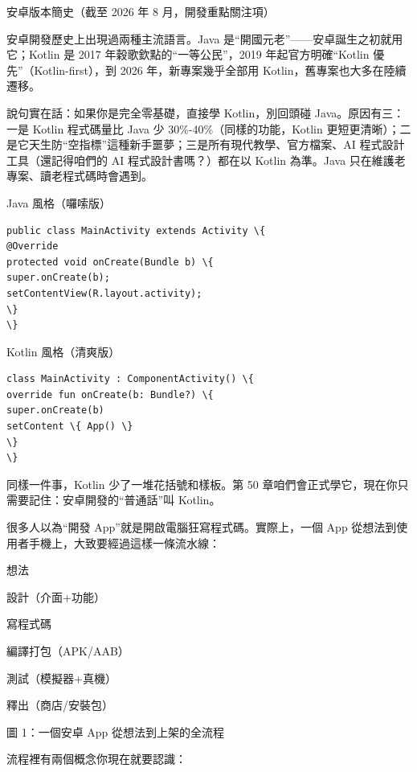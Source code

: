 \begin{center}\small\color{gray}安卓版本簡史（截至 2026 年 8 月，開發重點關注項）\end{center}


安卓開發歷史上出現過兩種主流語言。Java 是“開國元老”——安卓誕生之初就用它；Kotlin 是 2017 年穀歌欽點的“一等公民”，2019 年起官方明確“Kotlin 優先”（Kotlin-first），到 2026 年，新專案幾乎全部用 Kotlin，舊專案也大多在陸續遷移。

說句實在話：如果你是完全零基礎，直接學 Kotlin，別回頭碰 Java。原因有三：一是 Kotlin 程式碼量比 Java 少 30\%-40\%（同樣的功能，Kotlin 更短更清晰）；二是它天生防“空指標”這種新手噩夢；三是所有現代教學、官方檔案、AI 程式設計工具（還記得咱們的 AI 程式設計書嗎？）都在以 Kotlin 為準。Java 只在維護老專案、讀老程式碼時會遇到。

Java 風格（囉嗦版）

\begin{lstlisting}
public class MainActivity extends Activity \{
@Override
protected void onCreate(Bundle b) \{
super.onCreate(b);
setContentView(R.layout.activity);
\}
\}
\end{lstlisting}

Kotlin 風格（清爽版）

\begin{lstlisting}
class MainActivity : ComponentActivity() \{
override fun onCreate(b: Bundle?) \{
super.onCreate(b)
setContent \{ App() \}
\}
\}
\end{lstlisting}

同樣一件事，Kotlin 少了一堆花括號和樣板。第 50 章咱們會正式學它，現在你只需要記住：安卓開發的“普通話”叫 Kotlin。


很多人以為“開發 App”就是開啟電腦狂寫程式碼。實際上，一個 App 從想法到使用者手機上，大致要經過這樣一條流水線：

想法

設計（介面+功能）

寫程式碼

編譯打包（APK/AAB）

測試（模擬器+真機）

釋出（商店/安裝包）

\begin{center}\small\color{gray}圖 1：一個安卓 App 從想法到上架的全流程\end{center}

流程裡有兩個概念你現在就要認識：

